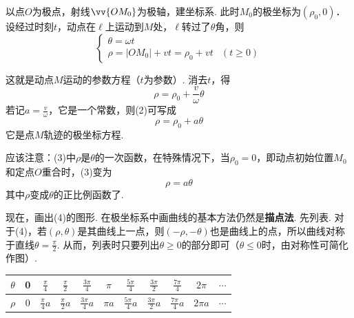 \begin{solution}
    以点$O$为极点，射线$\vv{OM_0}$为极轴，建坐标系. 此时$M_0$的极坐标为$(\rho_0,0)$．设经过时刻$t$，动点在$\ell$上运动到$M$处，$\ell$转过了$\theta$角，则
\begin{equation}
\begin{cases}
    \theta=\omega t\\
    \rho=|OM_0|+vt=\rho_0+vt & (t\ge 0)
\end{cases} \tag{1}
\end{equation}

\noindent
\begin{minipage}{.6\textwidth}
    这就是动点$M$运动的参数方程（$t$为参数）. 消去$t$，得
    \begin{equation}
        \rho=\rho_0+\frac{v}{\omega}\theta \tag{2}
    \end{equation}
    若记$a=\frac{v}{\omega}$，它是一个常数，则(2)可写成
    \begin{equation}
        \rho=\rho_0+a\theta  \tag{3}
    \end{equation}
    它是点$M$轨迹的极坐标方程.
\end{minipage}
\hfill
\begin{minipage}{.35\textwidth}
\centering
{}
\end{minipage}



应该注意：(3)中$\rho$是$\theta$的一次函数，在特殊情况下，当$\rho_0=0$，即动点初始位置$M_0$和定点$O$重合时，(3)变为
\begin{equation}
    \rho=a\theta  \tag{4}
\end{equation}
其中$\rho$变成$\theta$的正比例函数了.

现在，画出(4)的图形. 在极坐标系中画曲线的基本方法仍然是\textbf{描点法}. 先列表. 对于(4)，若$(\rho,\theta)$是其曲线上一点，则$(-\rho,-\theta)$也是曲线上的点，所以曲线对称于直线$\theta=\frac{\pi}{2}$. 从而，列表时只要列出$\theta\ge 0$的部分即可（$\theta\le 0$时，由对称性可简化作图）.

\begin{center}
\begin{tabular}{c|cccccccccc}
\hline
    $\theta$ & 0 &$\frac{\pi}{4}$& $\frac{\pi}{2}$& $\frac{3\pi}{4}$& $\pi$& $\frac{5\pi}{4}$& $\frac{3\pi}{2}$ & $\frac{7\pi}{4}$ & $2\pi$ & $\cdots$ \\
    \hline
$\rho$ & 0 &$\frac{\pi}{4}a$& $\frac{\pi}{2}a$& $\frac{3\pi}{4}a$& $\pi a$& $\frac{5\pi}{4}a$& $\frac{3\pi}{2}a$ & $\frac{7\pi}{4}a$ & $2\pi a$ & $\cdots$ \\
\hline
\end{tabular}
\end{center}


\end{solution}
